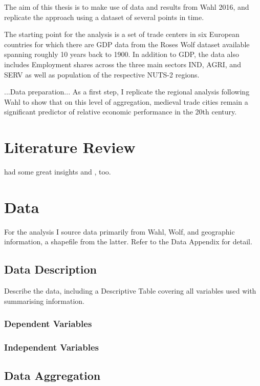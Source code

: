\documentclass[
12pt, %
english, %
onehalfspacing, %
oneside,
headsepline, %
openany
]{MastersDoctoralThesis} %
\begin{document}
The aim of this thesis is to make use of data and results from Wahl 2016, and replicate the approach using a dataset of several points in time.

The starting point for the analysis is a set of trade centers in six European countries for which there are GDP data from the Roses Wolf dataset available spanning roughly 10 years back to 1900. In addition to GDP, the data also includes Employment shares across the three main sectors IND, AGRI, and SERV as well as population of the respective NUTS-2 regions.

...Data preparation...
As a first step, I replicate the regional analysis following Wahl to show that on this level of aggregation, medieval trade cities remain a significant predictor of relative economic performance in the 20th century.



\newpage

\chapter{Literature Review}

\citep{smith1776} had some great insights and \citet{krugman1998}, too.

\newpage

\chapter{Data}
For the analysis I source data primarily from Wahl, Wolf, and geographic information, a  shapefile from the latter. Refer to the Data Appendix for detail. 
 
\section{Data Description}
Describe the data, including a Descriptive Table covering all variables used with summarising information.

\subsection{Dependent Variables}

\subsection{Independent Variables}

\section{Data Aggregation}
\end{document}

